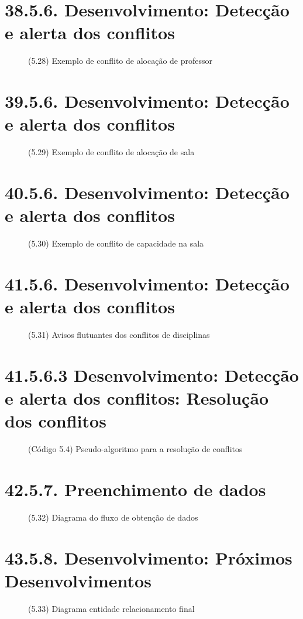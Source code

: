 \chapter*{38.5.6. Desenvolvimento: Detecção e alerta dos conflitos}
\begin{figure}[htpb]\caption{(5.28) Exemplo de conflito de alocação de professor}\end{figure}
\chapter*{39.5.6. Desenvolvimento: Detecção e alerta dos conflitos}
\begin{figure}[htpb]\caption{(5.29) Exemplo de conflito de alocação de sala}\end{figure}
\chapter*{40.5.6. Desenvolvimento: Detecção e alerta dos conflitos}
\begin{figure}[htpb]\caption{(5.30) Exemplo de conflito de capacidade na sala}\end{figure}
\chapter*{41.5.6. Desenvolvimento: Detecção e alerta dos conflitos}
\begin{figure}[htpb]\caption{(5.31) Avisos flutuantes dos conflitos de disciplinas}\end{figure}
\chapter*{41.5.6.3 Desenvolvimento: Detecção e alerta dos conflitos: Resolução dos conflitos}
\begin{figure}[htpb]\caption{(Código 5.4) Pseudo-algoritmo para a resolução de conflitos}\end{figure}
\chapter*{42.5.7. Preenchimento de dados}
\begin{figure}[htpb]\caption{(5.32) Diagrama do fluxo de obtenção de dados}\end{figure}
\chapter*{43.5.8. Desenvolvimento: Próximos Desenvolvimentos}
\begin{figure}[htpb]\caption{(5.33) Diagrama entidade relacionamento final}\end{figure}
